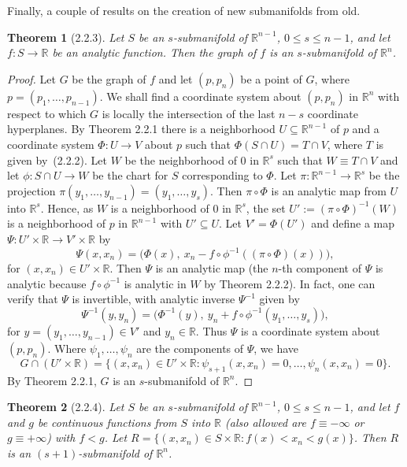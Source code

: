 \documentclass[11pt]{article}
\theoremstyle{plain}
\newtheorem*{theorem*}{Theorem}
\theoremstyle{definition}
\newcommand{\R}{\mathbb{R}}
\begin{document}
Finally, a couple of results on the creation of new submanifolds from
old.

\begin{theorem*}[2.2.3]
Let $S$ be an $s$-submanifold of $\R^{n-1}$, $0 \le s \le n-1$, and let
$f: S \to \R$ be an analytic function. Then the graph of $f$ is an
$s$-submanifold of $\R^n$.
\end{theorem*}

\begin{proof}
Let $G$ be the graph of $f$ and let $(p, p_n)$ be a point of $G$, where
$p = (p_1, \ldots, p_{n-1})$. We shall find a coordinate system about
$(p, p_n)$ in $\R^n$ with respect to which $G$ is locally the
intersection of the last $n-s$ coordinate hyperplanes. By Theorem 2.2.1
there is a neighborhood $U \subseteq \R^{n-1}$ of $p$ and a coordinate
system $\Phi: U \to V$ about $p$ such that $\Phi(S \cap U) = T \cap V$,
where $T$ is given by~(2.2.2). Let $W$ be the neighborhood of $0$ in
$\R^s$ such that $W \equiv T \cap V$ and let $\phi: S \cap U \to W$ be
the chart for $S$ corresponding to $\Phi$. Let $\pi: \R^{n-1} \to \R^s$
be the projection $\pi(y_1, \ldots, y_{n-1}) = (y_1, \ldots, y_s)$. Then
$\pi \circ \Phi$ is an analytic map from $U$ into $\R^s$. Hence, as $W$
is a neighborhood of $0$ in $\R^s$, the set
$U' := (\pi \circ \Phi)^{-1}(W)$ is a neighborhood of $p$ in $\R^{n-1}$
with $U' \subseteq U$. Let $V' = \Phi(U')$ and define a map
$\Psi: U' \times \R \to V' \times \R$ by
\[
\Psi(x, x_n) = \bigl( \Phi(x),\
x_n - f \circ \phi^{-1}((\pi \circ \Phi)(x)) \bigr),
\]
for $(x, x_n) \in U' \times \R$. Then $\Psi$ is an analytic map (the
$n$-th component of $\Psi$ is analytic because $f \circ \phi^{-1}$ is
analytic in $W$ by Theorem 2.2.2). In fact, one can verify that $\Psi$
is invertible, with analytic inverse $\Psi^{-1}$ given by
\[
\Psi^{-1}(y, y_n) = \bigl( \Phi^{-1}(y),\
y_n + f \circ \phi^{-1}(y_1, \ldots, y_s) \bigr),
\]
for $y = (y_1, \ldots, y_{n-1}) \in V'$ and $y_n \in \R$. Thus $\Psi$ is
a coordinate system about $(p, p_n)$. Where $\psi_1, \ldots, \psi_n$ are
the components of $\Psi$, we have
\[
G \cap (U' \times \R) = \{ (x, x_n) \in U' \times \R :
\psi_{s+1}(x, x_n) = 0, \ldots, \psi_n(x, x_n) = 0 \}.
\]
By Theorem 2.2.1, $G$ is an $s$-submanifold of $\R^n$.
\end{proof}

\begin{theorem*}[2.2.4]
Let $S$ be an $s$-submanifold of $\R^{n-1}$, $0 \le s \le n-1$, and let
$f$ and $g$ be continuous functions from $S$ into $\R$ (also allowed are
$f \equiv -\infty$ or $g \equiv +\infty$) with $f < g$. Let
$R = \{ (x, x_n) \in S \times \R : f(x) < x_n < g(x) \}$. Then $R$ is an
$(s+1)$-submanifold of $\R^n$.
\end{theorem*}
\end{document}
